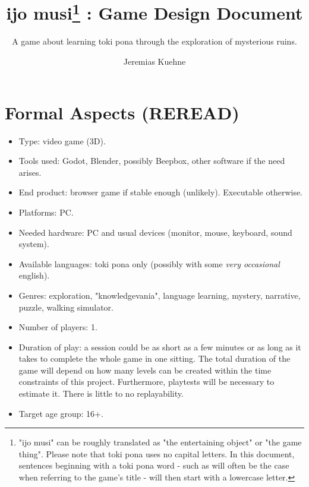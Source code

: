 \documentclass{scrartcl}
\title{ijo musi\footnote{"ijo musi" can be roughly translated as "the entertaining object" or "the game thing". Please note that toki pona uses no capital letters. In this document, sentences beginning with a toki pona word - such as will often be the case when referring to the game's title - will then start with a lowercase letter.} : Game Design Document}
\subtitle{A game about learning toki pona through the exploration of mysterious ruins.}
\author{Jeremias Kuehne}
\begin{document}
	
	\maketitle
	\clearpage
	
	\tableofcontents
	\clearpage
	
	\section{Formal Aspects (REREAD)}
		\begin{itemize}
			\item Type: video game (3D).
			\item Tools used: Godot, Blender, possibly Beepbox, other software if the need arises.
			\item End product: browser game if stable enough (unlikely). Executable otherwise.
			\item Platforms: PC.
			\item Needed hardware: PC and usual devices (monitor, mouse, keyboard, sound system).
			\item Available languages: toki pona only (possibly with some \textit{very occasional} english).
			\item Genres: exploration, "knowledgevania", language learning, mystery, narrative, puzzle, walking simulator.
			\item Number of players: 1.
			\item Duration of play: a session could be as short as a few minutes or as long as it takes to complete the whole game in one sitting. The total duration of the game will depend on how many levels can be created within the time constraints of this project. Furthermore, playtests will be necessary to estimate it. There is little to no replayability.
			\item Target age group: 16+.
		\end{itemize}
\end{document}
